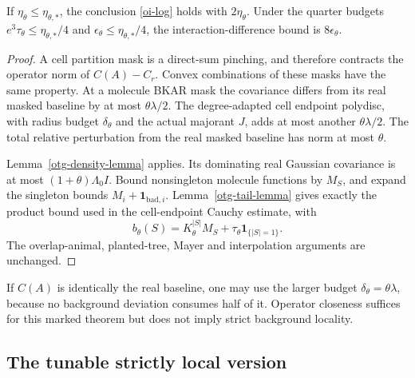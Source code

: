 \begin{theorem}\label{otg-mark-theorem}
If $\eta_\theta\le\eta_{\theta,*}$, the conclusion
\eqref{oi-log} holds with $2\eta_\theta$.
Under the quarter budgets
$e^3\tau_\theta\le\eta_{\theta,*}/4$ and
$\epsilon_\theta\le\eta_{\theta,*}/4$,
the interaction-difference bound is $8\epsilon_\theta$.
\end{theorem}
\begin{proof}
A cell partition mask is a direct-sum pinching, and therefore
contracts the operator norm of $C(A)-C_r$. Convex combinations
of these masks have the same property. At a molecule BKAR
mask the covariance differs from its real masked baseline by
at most $\theta\lambda/2$. The degree-adapted cell endpoint
polydisc, with radius budget $\delta_\theta$ and the actual
majorant $J$, adds at most another $\theta\lambda/2$.
The total relative perturbation from the real masked baseline
has norm at most $\theta$.

Lemma~\ref{otg-density-lemma} applies. Its dominating real
Gaussian covariance is at most $(1+\theta)\Lambda_0I$.
Bound nonsingleton molecule functions by $M_S$, and expand
the singleton bounds $M_i+\mathbf1_{\mathrm{bad},i}$.
Lemma~\ref{otg-tail-lemma} gives exactly the product bound
used in the cell-endpoint Cauchy estimate, with
\[
 b_\theta(S)=K_\theta^{|S|}M_S+
                      \tau_\theta\mathbf1_{\{|S|=1\}}.
\]
The overlap-animal, planted-tree, Mayer and interpolation
arguments are unchanged.
\end{proof}

If $C(A)$ is identically the real baseline, one may use the
larger budget $\delta_\theta=\theta\lambda$, because no
background deviation consumes half of it.
Operator closeness suffices for this marked theorem but does
not imply strict background locality.

\subsection{The tunable strictly local version}


